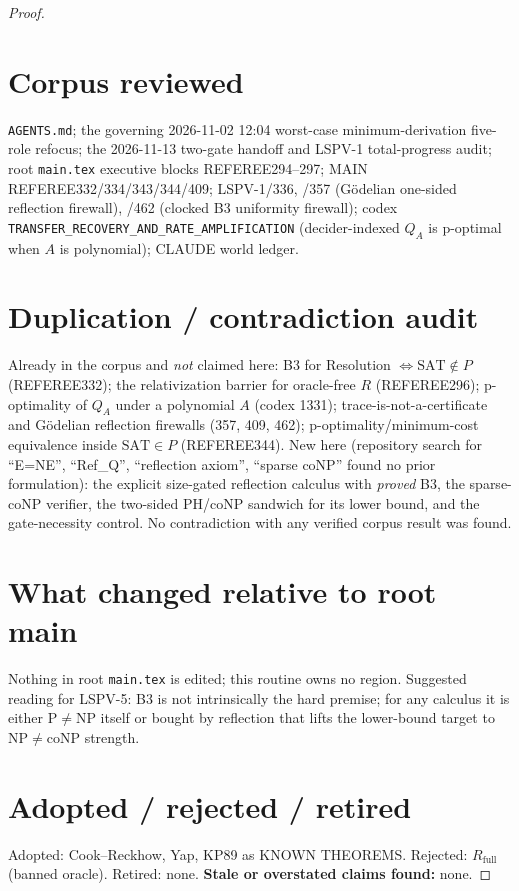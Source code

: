 \documentclass[11pt]{article}
\theoremstyle{definition}
\theoremstyle{remark}
\newcommand{\SAT}{\mathrm{SAT}}
\newcommand{\NP}{\mathrm{NP}}
\newcommand{\coNP}{\mathrm{coNP}}
\begin{document}
\begin{proof}
\section*{Corpus reviewed}
\texttt{AGENTS.md}; the governing 2026-11-02 12:04 worst-case minimum-derivation five-role refocus; the 2026-11-13
two-gate handoff and LSPV-1 total-progress audit; root \texttt{main.tex} executive blocks REFEREE294--297; MAIN
REFEREE332/334/343/344/409; LSPV-1/336, /357 (Gödelian one-sided reflection firewall), /462 (clocked B3
uniformity firewall); codex \texttt{TRANSFER\_RECOVERY\_AND\_RATE\_AMPLIFICATION} (decider-indexed $Q_A$ is
p-optimal when $A$ is polynomial); CLAUDE world ledger.

\section*{Duplication / contradiction audit}
Already in the corpus and \emph{not} claimed here: B3 for Resolution $\iff\SAT\notin P$ (REFEREE332); the
relativization barrier for oracle-free $R$ (REFEREE296); p-optimality of $Q_A$ under a polynomial $A$ (codex
1331); trace-is-not-a-certificate and Gödelian reflection firewalls (357, 409, 462); p-optimality/minimum-cost
equivalence inside $\SAT\in P$ (REFEREE344). New here (repository search for ``E=NE'', ``Ref\_Q'', ``reflection
axiom'', ``sparse coNP'' found no prior formulation): the explicit size-gated reflection calculus with
\emph{proved} B3, the sparse-$\coNP$ verifier, the two-sided PH/coNP sandwich for its lower bound, and the
gate-necessity control. No contradiction with any verified corpus result was found.

\section*{What changed relative to root main}
Nothing in root \texttt{main.tex} is edited; this routine owns no region. Suggested reading for LSPV-5:
B3 is not intrinsically the hard premise; for any calculus it is either P$\ne$NP itself or bought by
reflection that lifts the lower-bound target to $\NP\ne\coNP$ strength.

\section*{Adopted / rejected / retired}
Adopted: Cook--Reckhow, Yap, KP89 as KNOWN THEOREMS. Rejected: $R_{\mathrm{full}}$ (banned oracle). Retired: none.
\textbf{Stale or overstated claims found:} none.


\end{proof}
\end{document}
